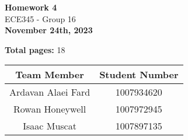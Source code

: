 \begin{titlepage}
    \begin{center}
    {\fontsize{40}{48}\selectfont \bfseries Homework 4} 
    \\\vspace{20pt}
    {\LARGE ECE345 - Group 16} \\
    \vspace{20pt}
    \textbf{November 24th, 2023}
    \vspace{8pt}

    \textbf{Total pages:} 18
    \end{center}

    \begin{table}[!ht]
        \centering
        \begin{tabular}{|c|c|}
        \hline
            \textbf{Team Member} & \textbf{Student Number} \\ \hline
            Ardavan Alaei Fard & 1007934620 \\ \hline
            Rowan Honeywell & 1007972945 \\ \hline
            Isaac Muscat & 1007897135 \\ \hline
        \end{tabular}
    \end{table}
\end{titlepage}